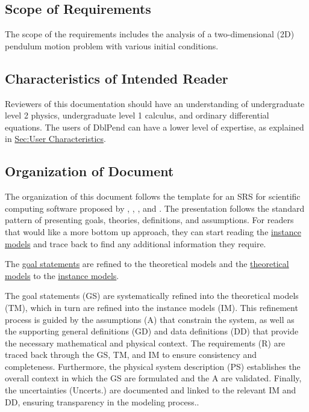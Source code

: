 \documentclass[12pt]{article}
\begin{document}
{\subsection{Scope of Requirements}
\label{Sec:ReqsScope}
The scope of the requirements includes the analysis of a two-dimensional (2D) pendulum motion problem with various initial conditions.

\subsection{Characteristics of Intended Reader}
\label{Sec:ReaderChars}
Reviewers of this documentation should have an understanding of undergraduate level 2 physics, undergraduate level 1 calculus, and ordinary differential equations. The users of DblPend can have a lower level of expertise, as explained in \hyperref[Sec:UserChars]{Sec:User Characteristics}.

\subsection{Organization of Document}
\label{Sec:DocOrg}
The organization of this document follows the template for an SRS for scientific computing software proposed by \cite{koothoor2013}, \cite{smithLai2005}, \cite{smithEtAl2007}, and \cite{smithKoothoor2016}. The presentation follows the standard pattern of presenting goals, theories, definitions, and assumptions. For readers that would like a more bottom up approach, they can start reading the \hyperref[Sec:IMs]{instance models} and trace back to find any additional information they require.

The \hyperref[Sec:GoalStmt]{goal statements} are refined to the theoretical models and the \hyperref[Sec:TMs]{theoretical models} to the \hyperref[Sec:IMs]{instance models}.

The goal statements (GS) are systematically refined into the theoretical models (TM), which in turn are refined into the instance models (IM). This refinement process is guided by the assumptions (A) that constrain the system, as well as the supporting general definitions (GD) and data definitions (DD) that provide the necessary mathematical and physical context. The requirements (R) are traced back through the GS, TM, and IM to ensure consistency and completeness. Furthermore, the physical system description (PS) establishes the overall context in which the GS are formulated and the A are validated. Finally, the uncertainties (Uncerts.) are documented and linked to the relevant IM and DD, ensuring transparency in the modeling process..

}
\end{document}
